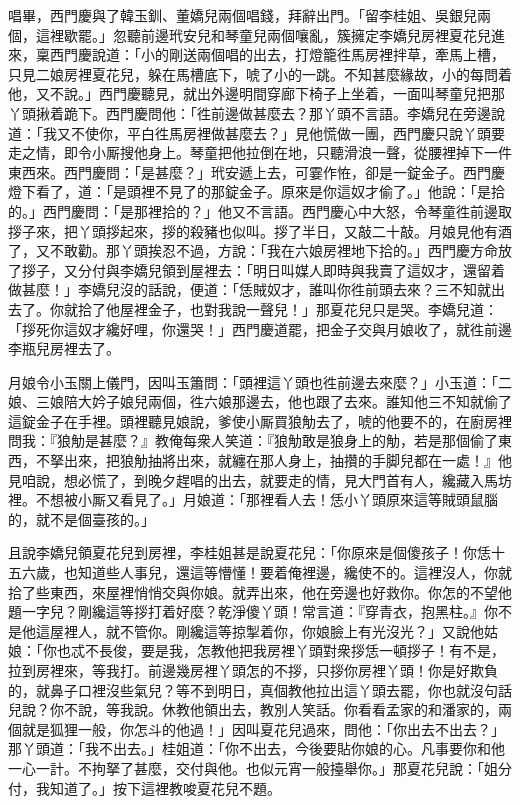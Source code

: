 唱畢，西門慶與了韓玉釧、董嬌兒兩個唱錢，拜辭出門。「留李桂姐、吳銀兒兩個，這裡歇罷。」忽聽前邊玳安兒和琴童兒兩個嚷亂，簇擁定李嬌兒房裡夏花兒進來，稟西門慶說道：「小的剛送兩個唱的出去，打燈籠徃馬房裡拌草，牽馬上槽，只見二娘房裡夏花兒，躲在馬槽底下，唬了小的一跳。不知甚麼緣故，小的每問着他，又不說。」西門慶聽見，就出外邊明間穿廊下椅子上坐着，一面叫琴童兒把那丫頭揪着跪下。西門慶問他：「徃前邊做甚麼去？那丫頭不言語。李嬌兒在旁邊說道：「我又不使你，平白徃馬房裡做甚麼去？」見他慌做一團，西門慶只說丫頭要走之情，即令小厮搜他身上。琴童把他拉倒在地，只聽滑浪一聲，從腰裡掉下一件東西來。西門慶問：「是甚麼？」玳安遞上去，可霎作恠，卻是一錠金子。西門慶燈下看了，道：「是頭裡不見了的那錠金子。原來是你這奴才偷了。」他說：「是拾的。」西門慶問：「是那裡拾的？」他又不言語。西門慶心中大怒，令琴童徃前邊取拶子來，把丫頭拶起來，拶的殺豬也似叫。拶了半日，又敲二十敲。月娘見他有酒了，又不敢勸。那丫頭挨忍不過，方說：「我在六娘房裡地下拾的。」西門慶方命放了拶子，又分付與李嬌兒領到屋裡去：「明日叫媒人即時與我賣了這奴才，還留着做甚麼！」李嬌兒沒的話說，便道：「恁賊奴才，誰叫你徃前頭去來？三不知就出去了。你就拾了他屋裡金子，也對我說一聲兒！」{}那夏花兒只是哭。李嬌兒道：「拶死你這奴才纔好哩，你還哭！」西門慶道罷，把金子交與月娘收了，就徃前邊李瓶兒房裡去了。

月娘令小玉關上儀門，因叫玉簫問：「頭裡這丫頭也徃前邊去來麼？」小玉道：「二娘、三娘陪大妗子娘兒兩個，徃六娘那邊去，他也跟了去來。誰知他三不知就偷了這錠金子在手裡。頭裡聽見娘說，爹使小厮買狼觔去了，唬的他要不的，在廚房裡問我：『狼觔是甚麼？』教俺每衆人笑道：『狼觔敢是狼身上的觔，若是那個偷了東西，不拏出來，把狼觔抽將出來，就纏在那人身上，抽攢的手脚兒都在一處！』他見咱說，想必慌了，到晚夕趕唱的出去，就要走的情，見大門首有人，纔藏入馬坊裡。不想被小厮又看見了。」月娘道：「那裡看人去！恁小丫頭原來這等賊頭鼠腦的，就不是個臺孩的。」

且說李嬌兒領夏花兒到房裡，李桂姐甚是說夏花兒：「你原來是個傻孩子！你恁十五六歲，也知道些人事兒，還這等懵懂！要着俺裡邊，纔使不的。這裡沒人，你就拾了些東西，來屋裡悄悄交與你娘。就弄出來，他在旁邊也好救你。你怎的不望他題一字兒？剛纔這等拶打着好麼？乾淨傻丫頭！常言道：『穿青衣，抱黑柱。』你不是他這屋裡人，就不管你。剛纔這等掠掣着你，你娘臉上有光沒光？」又說他姑娘：「你也忒不長俊，要是我，怎教他把我房裡丫頭對衆拶恁一頓拶子！有不是，拉到房裡來，等我打。前邊幾房裡丫頭怎的不拶，只拶你房裡丫頭！你是好欺負的，就鼻子口裡沒些氣兒？等不到明日，真個教他拉出這丫頭去罷，你也就沒句話兒說？你不說，等我說。休教他領出去，教別人笑話。你看看孟家的和潘家的，兩個就是狐狸一般，你怎斗的他過！」因叫夏花兒過來，問他：「你出去不出去？」那丫頭道：「我不出去。」桂姐道：「你不出去，今後要貼你娘的心。凡事要你和他一心一計。不拘拏了甚麼，交付與他。也似元宵一般擡舉你。」那夏花兒說：「姐分付，我知道了。」按下這裡教唆夏花兒不題。

